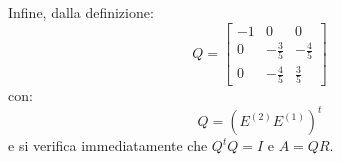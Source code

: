 \begin{example}
Infine, dalla definizione:
\[
Q=
\begin{bmatrix}
 -1 & 0 & 0\\
 0 & -\frac{3}{5} & -\frac{4}{5}\\
 0 & -\frac{4}{5} & \frac{3}{5}
\end{bmatrix}
\]
con:
\[
Q={(E^{(2)}E^{(1)})}^t
\]
e si verifica immediatamente che $Q^{t}Q=I$ e $A=QR$.
\end{example}


